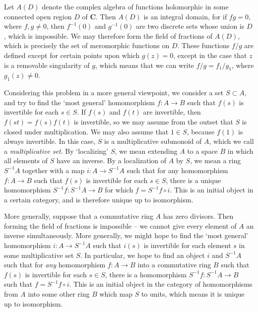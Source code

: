 \begin{example}
    Let $A(D)$ denote the complex algebra of functions holomorphic in some connected open region $D$ of $\mathbf{C}$. Then $A(D)$ is an integral domain, for if $fg = 0$, where $f,g \neq 0$, then $f^{-1}(0)$ and $g^{-1}(0)$ are two discrete sets whose union is $D$, which is impossible. We may therefore form the field of fractions of $A(D)$, which is precisely the set of meromorphic functions on $D$. These functions $f/g$ are defined except for certain points upon which $g(z) = 0$, except in the case that $z$ is a removable singularity of $g$, which means that we can write $f/g = f_1/g_1$, where $g_1(z) \neq 0$.
\end{example}

Considering this problem in a more general viewpoint, we consider a set $S \subset A$, and try to find the `most general' homomorphism $f: A \to B$ such that $f(s)$ is invertible for each $s \in S$. If $f(s)$ and $f(t)$ are invertible, then $f(st) = f(s)f(t)$ is invertible, so we may assume from the outset that $S$ is closed under multiplication. We may also assume that $1 \in S$, because $f(1)$ is always invertible. In this case, $S$ is a multiplicative submonoid of $A$, which we call a \emph{multiplicative set}. By `localizing' $S$, we mean extending $A$ to a space $B$ in which all elements of $S$ have an inverse. By a localization of $A$ by $S$, we mean a ring $S^{-1}A$ together with a map $i: A \to S^{-1}A$ such that for any homomorphism $f:A \to B$ such that $f(s)$ is invertible for each $s \in S$, there is a unique homomorphism $S^{-1}f: S^{-1}A \to B$ for which $f = S^{-1}f \circ i$. This is an initial object in a certain category, and is therefore unique up to isomorphism.

More generally, suppose that a commutative ring $A$ has zero divisors. Then forming the field of fractions is impossible -- we cannot give every element of $A$ an inverse simultaneously. More generally, we might hope to find the `most general' homomorphism $i: A \to S^{-1}A$ such that $i(s)$ is invertible for each element $s$ in some multiplicative set $S$. In particular, we hope to find an object $i$ and $S^{-1}A$ such that for {\it any} homomorphism $f: A \to B$ into a commutative ring $B$ such that $f(s)$ is invertible for each $s \in S$, there is a homomorphism $S^{-1}f: S^{-1}A \to B$ such that $f = S^{-1}f \circ i$. This is an initial object in the category of homomorphisms from $A$ into some other ring $B$ which map $S$ to units, which means it is unique up to isomorphism.

